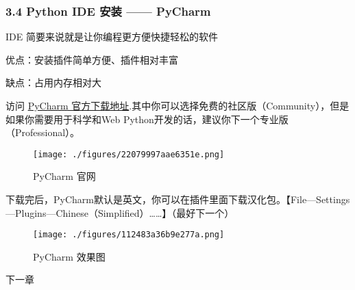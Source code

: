 \subsubsection{3.4 Python IDE 安装 —— PyCharm}

IDE 简要来说就是让你编程更方便快捷轻松的软件

优点：安装插件简单方便、插件相对丰富

缺点：占用内存相对大

访问 \href{http://www.jetbrains.com/pycharm/download/}{PyCharm 官方下载地址}.其中你可以选择免费的社区版（Community），但是如果你需要用于科学和Web Python开发的话，建议你下一个专业版（Professional）。

\begin{figure}[ht]
\centering
\texttt{[image: ./figures/22079997aae6351e.png]}
\caption{PyCharm 官网} \label{fig_Pyc1_3}
\end{figure}

下载完后，PyCharm默认是英文，你可以在插件里面下载汉化包。【File—Settings—Plugins—Chinese（Simplified）……】（最好下一个）
\begin{figure}[ht]
\centering
\texttt{[image: ./figures/112483a36b9e277a.png]}
\caption{PyCharm 效果图} \label{fig_Pyc1_4}
\end{figure}

下一章 
